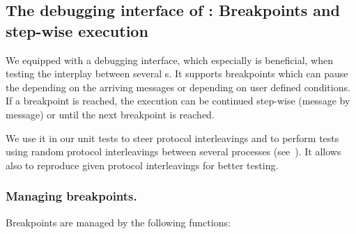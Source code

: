 \subsection{\texorpdfstring{The debugging interface of :
  Breakpoints and step-wise execution}
  {The debugging interface of gen\_component: Breakpoints and step-wise execution}}

We equipped  with a debugging interface, which
especially is beneficial, when testing the interplay between several
s. It supports breakpoints which can pause the
 depending on the arriving messages or depending
on user defined conditions. If a breakpoint is reached, the execution can be
continued step-wise (message by message) or until the next breakpoint is
reached.

We use it in our unit tests to steer protocol interleavings and to perform
tests using random protocol interleavings between several processes
(see~). It allows also to reproduce given protocol
interleavings for better testing.

\subsubsection{Managing breakpoints.}

Breakpoints are managed by the following functions:


